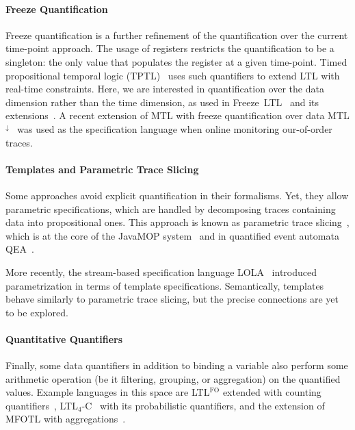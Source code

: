 \documentclass{article}
\begin{document}
\paragraph{Freeze Quantification}

Freeze quantification is a further refinement of the quantification over the current time-point approach. The usage of registers restricts the quantification to be a singleton: the only value that populates the register at a given time-point.
Timed propositional temporal logic (TPTL)~\cite{AlurH94} uses such quantifiers to extend LTL with real-time constraints. Here, we are interested in quantification over the data dimension rather than the time dimension, as used in Freeze~LTL~\cite{DemriLN07} and its extensions~\cite{DeckerT16}. A recent extension of MTL with freeze quantification over data MTL$^\downarrow$~\cite{BasinKZ17} was used as the specification language when online monitoring our-of-order traces.

\paragraph{Templates and Parametric Trace Slicing}

Some approaches avoid explicit quantification in their formalisms. Yet, they allow parametric specifications, which are handled by decomposing traces containing data into propositional ones. This approach is known as parametric trace slicing~\cite{ChenR09,RegerR15}, which is at the core of the JavaMOP system~\cite{MeredithJGCR12} and in quantified event automata 
QEA~\cite{BarringerFHRR12}.

More recently, the stream-based specification language LOLA~\cite{FaymonvilleFST16} introduced parametrization in terms of template specifications. Semantically, templates behave similarly to parametric trace slicing, but the precise connections are yet to be explored.

\paragraph{Quantitative Quantifiers}

Finally, some data quantifiers in addition to binding a variable also perform some arithmetic operation (be it filtering, grouping, or aggregation) on the quantified values.
Example languages in this space are
LTL$^{\text{FO}}$ extended with counting quantifiers~\cite{BauerGT09},
LTL$_4$-C~\cite{MedhatBFJ16} with its probabilistic quantifiers, and the extension of MFOTL with aggregations~\cite{BasinKMZ15}.



\end{document}
